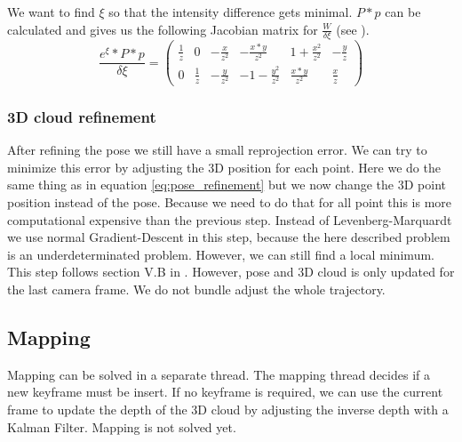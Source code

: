 \documentclass[11pt,a4paper,titlepage,oneside]{report}
\begin{document}
We want to find $\xi$ so that the intensity difference gets minimal. $P*p$ can be calculated and gives us the following Jacobian matrix for $\frac{W}{\delta \xi}$ (see \cite{se3_explain}).
\begin{equation}
	\frac{e^{\xi}*P*p}{\delta \xi}=\begin{pmatrix}
		\frac{1}{z} & 0 & -\frac{x}{z^2} & -\frac{x*y}{z^2} & 1 + \frac{x^2}{z^2} & -\frac{y}{z} \\
		0 & \frac{1}{z}  & -\frac{y}{z^2} & -1 - \frac{y^2}{z^2} & \frac{x*y}{z^2} &  \frac{x}{z}
	\end{pmatrix}
\end{equation}



\subsubsection{3D cloud refinement}
After refining the pose we still have a small reprojection error. We can try to minimize this error by adjusting the 3D position for each point. Here we do the same thing as in equation \ref{eq:pose_refinement} but we now change the 3D point position instead of the pose. Because we need to do that for all point this is more computational expensive than the previous step. Instead of Levenberg-Marquardt we use normal Gradient-Descent in this step, because the here described problem is an underdeterminated problem. However, we can still find a local minimum. This step follows section V.B in \cite{svo2}. However, pose and 3D cloud is only updated for the last camera frame. We do not bundle adjust the whole trajectory.

\subsection{Mapping}

Mapping can be solved in a separate thread. The mapping thread decides if a new keyframe must be insert. If no keyframe is required, we can use the current frame to update the depth of the 3D cloud by adjusting the inverse depth with a Kalman Filter. Mapping is not solved yet.
\end{document}

